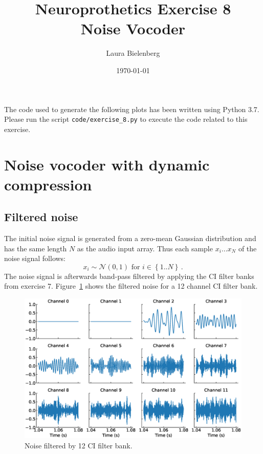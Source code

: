 \documentclass{scrartcl}			%
\title{Neuroprothetics Exercise 8\\Noise Vocoder}
\author{ Laura Bielenberg }
\date{\today}
\begin{document}

\maketitle

The code used to generate the following plots has been written using Python 3.7. Please run the  script \texttt{code/exercise\_8.py} to execute the code related to this exercise.

\section{Noise vocoder with dynamic compression}

\subsection{Filtered noise}\label{sec:filtnoise}
The initial noise signal is generated from a zero-mean Gaussian distribution and has the same length $N$ as the audio input array. Thus each sample $x_i ... x_N$ of the noise signal follows:
\begin{equation}
	x_i \sim \mathcal{N}(0, 1) \text{ for } i \in \left\{1 .. N\right\} \, .
\end{equation}
The noise signal is afterwards band-pass filtered by applying the CI filter banks from exercise 7.
Figure~\ref{fig:noise} shows the filtered noise for a 12 channel CI filter bank.

\begin{figure}[H]
\centering
   		 \includegraphics[width=\linewidth]{imgs/noise_filtered_timeslot.eps}
   		 \caption{Noise filtered by 12 CI filter bank.} 
   		 \label{fig:noise} 


\end{figure}
\end{document}
